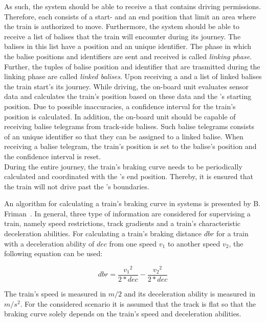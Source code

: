 As such, the system should be able to receive a  that contains driving permissions.
Therefore, each  consists of a start- and an end position that limit an area where the train is authorized to move.
Furthermore, the system should be able to receive a list of balises that the train will encounter during its journey.
The balises in this list have a position and an unique identifier.
The phase in which the balise positions and identifiers are sent and received is called \textit{linking phase}.
Further, the tuples of balise position and identifier that are trasmitted during the linking phase are called \textit{linked balises}.
Upon receiving a  and a list of linked balises the train start's its journey.
While driving, the on-board unit evaluates sensor data and calculates the train's position based on these data and the 's starting position.
Due to possible inaccuracies, a confidence interval for the train's position is calculated.
In addition, the on-board unit should be capable of receiving balise telegrams from track-side balises.
Such balise telegrams consists of an unique identifier so that they can be assigned to a linked balise.
When receiving a balise telegram, the train's position is set to the balise's position and the confidence interval is reset.
\\

During the entire journey, the train's braking curve needs to be periodically calculated and coordinated with the 's end position.
Thereby, it is ensured that the train will not drive past the 's boundaries.

An algorithm for calculating a train's braking curve in  systems is presented by B. Friman~\cite{CalculateBrakeCurveFriman}.
In general, three type of information are considered for supervising a train, namely speed restrictions, track gradients and a train's characteristic deceleration abilities.
For calculating a train's braking distance $dbr$ for a train with a deceleration ability of $dec$ from one speed $v_1$ to another speed $v_2$, the following equation can be used:

\begin{equation}
dbr = \frac{{v_1}^2}{2*dec} - \frac{{v_2}^2}{2*dec}
\end{equation}

The train's speed is measured in $m/2$ and its deceleration ability is measured in $m/s^2$.
For the considered scenario it is assumed that the track is flat so that the braking curve solely depends on the train's speed and deceleration abilities.

